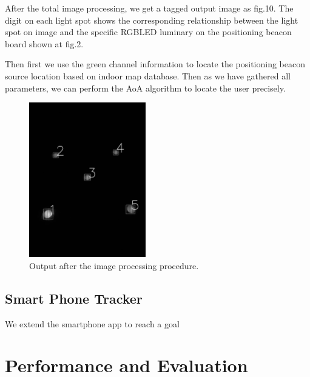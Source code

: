 \documentclass[conference]{IEEEtran}
\begin{document}
After the total image processing, we get a tagged output image as fig.10. The digit on each light spot shows the corresponding relationship between the light spot on image and the specific RGBLED luminary on the positioning beacon board shown at fig.2. 

Then first we use the green channel information to locate the positioning beacon source location based on indoor map database. Then as we have gathered all parameters, we can perform the AoA algorithm to locate the user precisely.

\begin{figure}
	\centering
	\includegraphics[width=2.0in]{../img.origin/fig10.jpg}
	\caption{Output after the image processing procedure.}
	\label{fig_10}
\end{figure}


\subsection{\textbf{Smart Phone Tracker}}
We extend the smartphone app to reach a goal 



\section{\textbf{Performance and Evaluation}}










\end{document}
